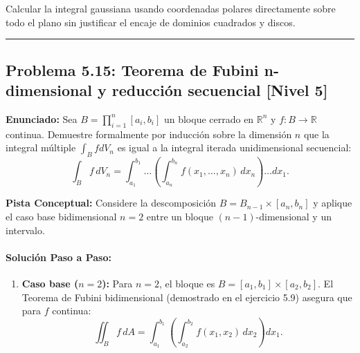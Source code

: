 \documentclass[11pt,a4paper]{article}
\begin{document}
\begin{trapbox}
Calcular la integral gaussiana usando coordenadas polares directamente sobre todo el plano sin justificar el encaje de dominios cuadrados y discos.
\end{trapbox}

\vspace{0.5cm}
\hrule
\vspace{0.5cm}

\subsection*{Problema 5.15: Teorema de Fubini n-dimensional y reducción secuencial \hfill \color{primaryblue}\small[Nivel 5]}

\begin{tcolorbox}[colback=white,colframe=gray!40,arc=1mm,boxrule=0.5pt,left=3mm,right=3mm,top=2mm,bottom=2mm]
\textbf{Enunciado:} Sea $B = \prod_{i=1}^n [a_i, b_i]$ un bloque cerrado en $\mathbb{R}^n$ y $f: B \to \mathbb{R}$ continua. Demuestre formalmente por inducción sobre la dimensión $n$ que la integral múltiple $\int_B f dV_n$ es igual a la integral iterada unidimensional secuencial:
\begin{equation*}
\int_B f \, dV_n = \int_{a_1}^{b_1} \dots \left( \int_{a_n}^{b_n} f(x_1, \dots, x_n) \, dx_n \right) \dots dx_1.
\end{equation*}
\end{tcolorbox}

\begin{tcolorbox}[colback=yellow!4,colframe=accentamber!70,arc=1mm,boxrule=0.5pt,left=3mm,right=3mm,top=1.5mm,bottom=1.5mm]
\textbf{Pista Conceptual:} Considere la descomposición $B = B_{n-1} \times [a_n, b_n]$ y aplique el caso base bidimensional $n=2$ entre un bloque $(n-1)$-dimensional y un intervalo.
\end{tcolorbox}

\paragraph{Solución Paso a Paso:}\par
\begin{enumerate}[label=\textbf{\arabic*.}]
\item \textbf{Caso base ($n = 2$):}
Para $n = 2$, el bloque es $B = [a_1, b_1] \times [a_2, b_2]$. El Teorema de Fubini bidimensional (demostrado en el ejercicio 5.9) asegura que para $f$ continua:
\begin{equation*}
\iint_B f \, dA = \int_{a_1}^{b_1} \left( \int_{a_2}^{b_2} f(x_1, x_2) \, dx_2 \right) dx_1.
\end{equation*}
\end{enumerate}
\end{document}
